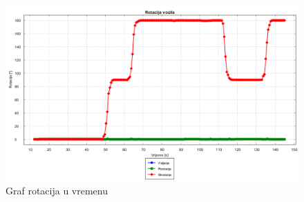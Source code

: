 \pagebreak
\begin{figure}[h!]
  \includegraphics[scale=0.4]{images/gt_rotacija.png}
  \caption{Graf rotacija u vremenu}
  \label{fig:gt_rotacija}
\end{figure}